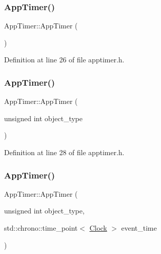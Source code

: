 \subsubsection{\texorpdfstring{App\+Timer()}{AppTimer()}\hspace{0.1cm}{\footnotesize\ttfamily [1/4]}}
{\footnotesize\ttfamily App\+Timer\+::\+App\+Timer (\begin{DoxyParamCaption}{ }\end{DoxyParamCaption})\hspace{0.3cm}{\ttfamily [inline]}}



Definition at line 26 of file apptimer.\+h.

\mbox{\label{class_app_timer_a06df15e33135f60f661c231e067951f3}} 
\subsubsection{\texorpdfstring{App\+Timer()}{AppTimer()}\hspace{0.1cm}{\footnotesize\ttfamily [2/4]}}
{\footnotesize\ttfamily App\+Timer\+::\+App\+Timer (\begin{DoxyParamCaption}\item[{unsigned int}]{object\+\_\+type }\end{DoxyParamCaption})\hspace{0.3cm}{\ttfamily [inline]}}



Definition at line 28 of file apptimer.\+h.

\mbox{\label{class_app_timer_a192075895ca575e9acb2663f3ebcecd6}} 
\subsubsection{\texorpdfstring{App\+Timer()}{AppTimer()}\hspace{0.1cm}{\footnotesize\ttfamily [3/4]}}
{\footnotesize\ttfamily App\+Timer\+::\+App\+Timer (\begin{DoxyParamCaption}\item[{unsigned int}]{object\+\_\+type,  }\item[{std\+::chrono\+::time\+\_\+point$<$ \hyperlink{universe_8h_a0ef8d951d1ca5ab3cfaf7ab4c7a6fd80}{Clock} $>$}]{event\+\_\+time }\end{DoxyParamCaption})\hspace{0.3cm}{\ttfamily [inline]}}



